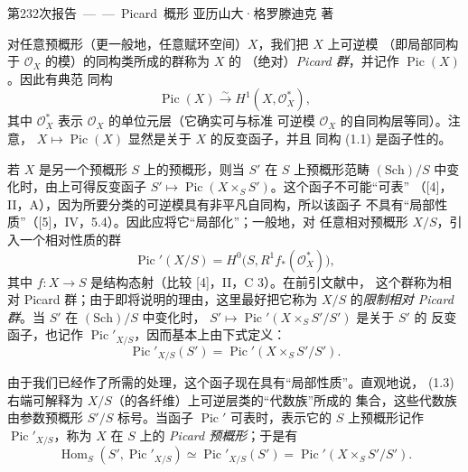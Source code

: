 \unit{第232次报告——Picard 概形}
%
  {亚历山大·格罗滕迪克 著}


对任意预概形（更一般地，任意赋环空间）$X$，我们把 $X$ 上可逆模
（即局部同构于 $\mathcal O_X$ 的模）的同构类所成的群称为 $X$ 的
（绝对）\emph{Picard 群}，并记作 $\operatorname{Pic}(X)$。因此有典范
同构
\begin{equation}
\operatorname{Pic}(X)\xrightarrow{\sim}H^1(X,\mathcal O_X^*),
\tag{1.1}
\end{equation}
其中 $\mathcal O_X^*$ 表示 $\mathcal O_X$ 的单位元层（它确实可与标准
可逆模 $\mathcal O_X$ 的自同构层等同）。注意，
$X\longmapsto\operatorname{Pic}(X)$ 显然是关于 $X$ 的反变函子，并且
同构 (1.1) 是函子性的。

若 $X$ 是另一个预概形 $S$ 上的预概形，则当 $S'$ 在 $S$ 上预概形范畴
$(\mathrm{Sch})/S$ 中变化时，由上可得反变函子
$S'\longmapsto\operatorname{Pic}(X\times_S S')$。这个函子不可能“可表”
（[4]，II，A），因为所要分类的可逆模具有非平凡自同构，所以该函子
不具有“局部性质”（[5]，IV，5.4）。因此应将它“局部化”；一般地，对
任意相对预概形 $X/S$，引入一个相对性质的群
\begin{equation}
\operatorname{Pic}'(X/S)=H^0\bigl(S,R^1f_*(\mathcal O_X^*)\bigr),
\tag{1.2}
\end{equation}
其中 $f:X\longrightarrow S$ 是结构态射（比较 [4]，II，C 3）。在前引文献中，
这个群称为相对 Picard 群；由于即将说明的理由，这里最好把它称为
$X/S$ 的\emph{限制相对 Picard 群}。当 $S'$ 在 $(\mathrm{Sch})/S$
中变化时，
$S'\longmapsto\operatorname{Pic}'(X\times_S S'/S')$ 是关于 $S'$ 的
反变函子，也记作 $\operatorname{Pic}'_{X/S}$，因而基本上由下式定义：
\begin{equation}
\operatorname{Pic}'_{X/S}(S')=
\operatorname{Pic}'(X\times_S S'/S').
\tag{1.3}
\end{equation}

由于我们已经作了所需的处理，这个函子现在具有“局部性质”。直观地说，
(1.3) 右端可解释为 $X/S$（的各纤维）上可逆层类的“代数族”所成的
集合，这些代数族由参数预概形 $S'/S$ 标号。当函子
$\operatorname{Pic}'$ 可表时，表示它的 $S$ 上预概形记作
$\operatorname{Pic}'_{X/S}$，称为 $X$ 在 $S$ 上的
\emph{Picard 预概形}；于是有
\begin{equation}
\operatorname{Hom}_S(S',\operatorname{Pic}'_{X/S})
\simeq\operatorname{Pic}'_{X/S}(S')
=\operatorname{Pic}'(X\times_S S'/S').
\tag{1.4}
\end{equation}

